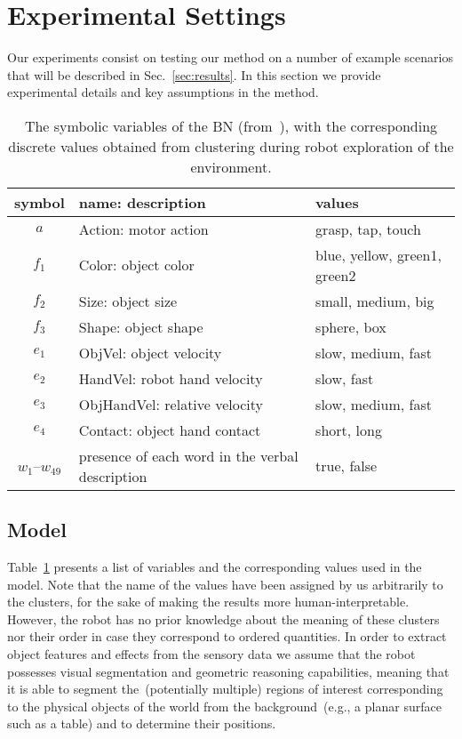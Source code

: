 
\section{Experimental Settings}
\label{sec:experimental_settings}
Our experiments consist on testing our method on a number of example scenarios that will be described in Sec.~\ref{sec:results}.
In this section we provide experimental details and key assumptions in the method.

\begin{table}
    \centering
    \caption{The symbolic variables of the \acl{BN} (from~\cite{salvi:2012:smcb}), with the corresponding discrete values obtained from clustering during robot exploration of the environment.}
    \label{tab:bnsymb}
    \begin{tabular}{cp{3.3cm}l}
    \toprule
    symbol & name: description     & values \\
    \midrule
    $a$    & Action: motor action  & grasp, tap, touch \\
    \midrule
    $f_1$  & Color: object color   & blue, yellow, green1, green2 \\
    $f_2$  & Size: object size     & small, medium, big \\
    $f_3$  & Shape: object shape   & sphere, box \\ %
    \midrule
    $e_1$  & ObjVel: object velocity                     & slow, medium, fast \\
    $e_2$  & HandVel: robot hand velocity                & slow, fast \\
    $e_3$  & ObjHandVel: relative \objecthand{} velocity & slow, medium, fast \\
    $e_4$  & Contact: object hand contact                & short, long \\
    \midrule
    $w_1$--$w_{49}$ & presence of each word in the verbal description & true, false \\
    \bottomrule
    \end{tabular}
\end{table}

\subsection{\AffWords{} Model}
Table~\ref{tab:bnsymb} presents a list of variables and the corresponding values used in the \AffWords{} model.
Note that the name of the values have been assigned by us arbitrarily to the clusters, for the sake of making the results more human-interpretable.
However, the robot has no prior knowledge about the meaning of these clusters nor their order in case they correspond to ordered quantities.
In order to extract object features and effects from the sensory data we assume that the robot possesses visual segmentation and geometric reasoning capabilities, meaning that it is able to segment the~(potentially multiple) regions of interest corresponding to the physical objects of the world from the background~(e.g., a planar surface such as a table) and to determine their positions.

